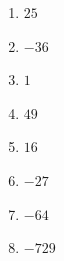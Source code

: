%
%
  \begin{enumerate}[cols=4]
    \item $25$
    \item $-36$
    \item $1$
    \item $49$
    \item $16$
    \item $-27$
    \item $-64$
    \item $-729$
  \end{enumerate}
